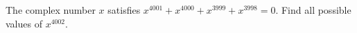 The complex number $x$ satisfies $x^{4001}+x^{4000}+x^{3999}+x^{3998}=0$. Find all possible values of $x^{4002}$.
